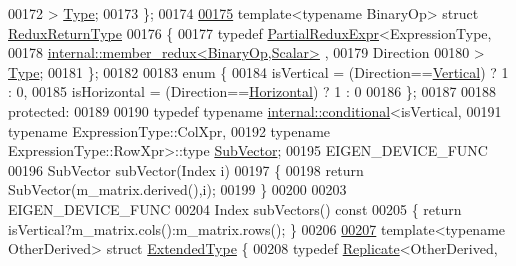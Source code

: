 \begin{DoxyCode}
00172                               > \hyperlink{group___core___module_class_eigen_1_1_partial_redux_expr}{Type};
00173     \};
00174 
\hyperlink{struct_eigen_1_1_vectorwise_op_1_1_redux_return_type}{00175}     \textcolor{keyword}{template}<\textcolor{keyword}{typename} BinaryOp> \textcolor{keyword}{struct }\hyperlink{struct_eigen_1_1_vectorwise_op_1_1_redux_return_type}{ReduxReturnType}
00176     \{
00177       \textcolor{keyword}{typedef} \hyperlink{group___core___module_class_eigen_1_1_partial_redux_expr}{PartialReduxExpr}<ExpressionType,
00178                                \hyperlink{struct_eigen_1_1internal_1_1member__redux}{internal::member\_redux<BinaryOp,Scalar>}
      ,
00179                                Direction
00180                               > \hyperlink{group___core___module_class_eigen_1_1_partial_redux_expr}{Type};
00181     \};
00182 
00183     \textcolor{keyword}{enum} \{
00184       isVertical   = (Direction==\hyperlink{group__enums_ggad49a7b3738e273eb00932271b36127f7addca718e0564723df21d61b94b1198be}{Vertical}) ? 1 : 0,
00185       isHorizontal = (Direction==\hyperlink{group__enums_ggad49a7b3738e273eb00932271b36127f7aae8a16b3b9272683c1162915f6d892be}{Horizontal}) ? 1 : 0
00186     \};
00187 
00188   \textcolor{keyword}{protected}:
00189 
00190     \textcolor{keyword}{typedef} \textcolor{keyword}{typename} \hyperlink{struct_eigen_1_1internal_1_1conditional}{internal::conditional}<isVertical,
00191                                \textcolor{keyword}{typename} ExpressionType::ColXpr,
00192                                \textcolor{keyword}{typename} ExpressionType::RowXpr>::type \hyperlink{class_eigen_1_1internal_1_1_tensor_lazy_evaluator_writable}{SubVector};
00195     EIGEN\_DEVICE\_FUNC
00196     SubVector subVector(Index i)
00197     \{
00198       \textcolor{keywordflow}{return} SubVector(m\_matrix.derived(),i);
00199     \}
00200 
00203     EIGEN\_DEVICE\_FUNC
00204     Index subVectors()\textcolor{keyword}{ const}
00205 \textcolor{keyword}{    }\{ \textcolor{keywordflow}{return} isVertical?m\_matrix.cols():m\_matrix.rows(); \}
00206 
\hyperlink{struct_eigen_1_1_vectorwise_op_1_1_extended_type}{00207}     \textcolor{keyword}{template}<\textcolor{keyword}{typename} OtherDerived> \textcolor{keyword}{struct }\hyperlink{struct_eigen_1_1_vectorwise_op_1_1_extended_type}{ExtendedType} \{
00208       \textcolor{keyword}{typedef} \hyperlink{group___core___module_class_eigen_1_1_replicate}{Replicate}<OtherDerived,

\end{DoxyCode}
